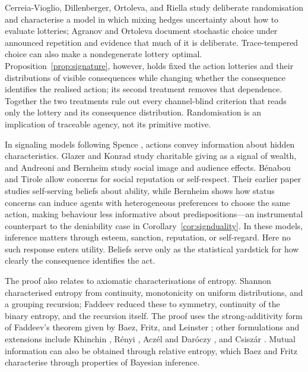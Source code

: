 \documentclass[11pt,a4paper]{article}
\theoremstyle{definition}
\newcommand{\1}{\mathbf 1}
\begin{document}
Cerreia-Vioglio, Dillenberger, Ortoleva, and Riella
\cite{CerreiaVioglioDillenbergerOrtolevaRiella2019} study deliberate randomisation and characterise a model in
which mixing hedges uncertainty about how to evaluate lotteries; Agranov and Ortoleva
\cite{AgranovOrtoleva2017} document stochastic choice under announced repetition and evidence that much of it is
deliberate.  Trace-tempered choice can also make a nondegenerate lottery optimal.
Proposition~\ref{prop:signature}, however, holds fixed the action lotteries and their distributions of visible
consequences while changing whether the consequence identifies the realised action; its second treatment removes
that dependence.  Together the two treatments rule out every channel-blind criterion that reads only the lottery
and its consequence distribution.  Randomisation is an implication of traceable agency, not its primitive
motive.

In signaling models following Spence \cite{Spence1973}, actions convey information about hidden characteristics.
Glazer and Konrad \cite{GlazerKonrad1996} study charitable giving as a signal of wealth, and Andreoni and Bernheim
\cite{AndreoniBernheim2009} study social image and audience effects.  B\'enabou and Tirole
\cite{BenabouTirole2006} allow concerns for social reputation or self-respect.  Their earlier paper
\cite{BenabouTirole2002} studies self-serving beliefs about ability, while Bernheim \cite{Bernheim1994} shows how
status concerns can induce agents with heterogeneous preferences to choose the same action, making behaviour less
informative about predispositions---an instrumental counterpart to the deniability case in
Corollary~\ref{cor:signduality}.  In these models, inference matters through esteem, sanction, reputation, or
self-regard.  Here no such response enters utility.  Beliefs serve only as the statistical yardstick for how
clearly the consequence identifies the act.

The proof also relates to axiomatic characterisations of entropy.  Shannon \cite{Shannon1948} characterised
entropy from continuity, monotonicity on uniform distributions, and a grouping recursion; Faddeev
\cite{Faddeev1956} reduced these to symmetry, continuity of the binary entropy, and the recursion itself.  The
proof uses the strong-additivity form of Faddeev's theorem given by Baez, Fritz, and Leinster
\cite{BaezFritzLeinster2011}; other formulations and extensions include Khinchin \cite{Khinchin1957}, R\'enyi
\cite{Renyi1961}, Acz\'el and Dar\'oczy \cite{AczelDaroczy1975}, and Csisz\'ar \cite{Csiszar2008}.  Mutual
information can also be obtained through relative entropy, which Baez and Fritz \cite{BaezFritz2014}
characterise through properties of Bayesian inference.
\end{document}
